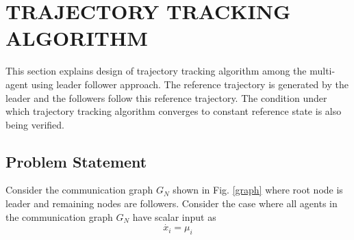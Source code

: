 \documentclass[twocolumn]{IETEJR}
\begin{document}
%
%

\section{TRAJECTORY TRACKING ALGORITHM}
This section explains design of trajectory tracking algorithm among the multi-agent using leader follower approach. The reference trajectory is generated by the leader and the followers follow this reference trajectory. The condition under which trajectory tracking algorithm converges to constant reference state is also being verified.

\subsection{Problem Statement}
Consider the communication graph $G_{N}$ shown in Fig. \ref{graph} where root node is leader and remaining nodes are followers. Consider the case where all agents in the communication graph $G_{N}$ have scalar input as 
\begin{equation}
\dot{x_{i}}=\mu_{i} \label{eq 4}
\end{equation} 
\end{document}
